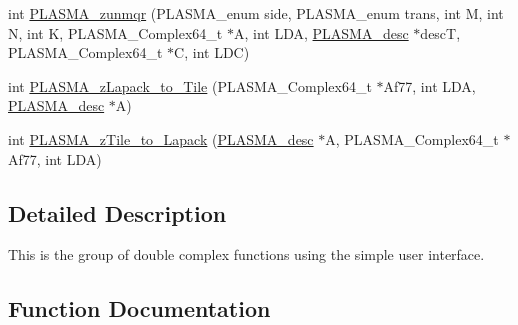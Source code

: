 \begin{DoxyCompactItemize}
int \hyperlink{group__PLASMA__Complex64__t_ga2a00379e9ae15c89c8a21d7dfa945e8f_ga2a00379e9ae15c89c8a21d7dfa945e8f}{P\+L\+A\+S\+M\+A\+\_\+zunmqr} (P\+L\+A\+S\+M\+A\+\_\+enum side, P\+L\+A\+S\+M\+A\+\_\+enum trans, int M, int N, int K, P\+L\+A\+S\+M\+A\+\_\+\+Complex64\+\_\+t $\ast$A, int L\+D\+A, \hyperlink{structplasma__desc__t}{P\+L\+A\+S\+M\+A\+\_\+desc} $\ast$desc\+T, P\+L\+A\+S\+M\+A\+\_\+\+Complex64\+\_\+t $\ast$C, int L\+D\+C)
\item 
int \hyperlink{group__PLASMA__Complex64__t_ga54817e0733e678bcdfdfeaa76ab486f6_ga54817e0733e678bcdfdfeaa76ab486f6}{P\+L\+A\+S\+M\+A\+\_\+z\+Lapack\+\_\+to\+\_\+\+Tile} (P\+L\+A\+S\+M\+A\+\_\+\+Complex64\+\_\+t $\ast$Af77, int L\+D\+A, \hyperlink{structplasma__desc__t}{P\+L\+A\+S\+M\+A\+\_\+desc} $\ast$A)
\item 
int \hyperlink{group__PLASMA__Complex64__t_ga8df0b9fdc5537a648d7544b528c9e6e3_ga8df0b9fdc5537a648d7544b528c9e6e3}{P\+L\+A\+S\+M\+A\+\_\+z\+Tile\+\_\+to\+\_\+\+Lapack} (\hyperlink{structplasma__desc__t}{P\+L\+A\+S\+M\+A\+\_\+desc} $\ast$A, P\+L\+A\+S\+M\+A\+\_\+\+Complex64\+\_\+t $\ast$Af77, int L\+D\+A)
\end{DoxyCompactItemize}


\subsection{Detailed Description}
This is the group of double complex functions using the simple user interface. 

\subsection{Function Documentation}
\hypertarget{group__PLASMA__Complex64__t_ga6733ad2b79f186348ba47778e2e26fae_ga6733ad2b79f186348ba47778e2e26fae}{}
